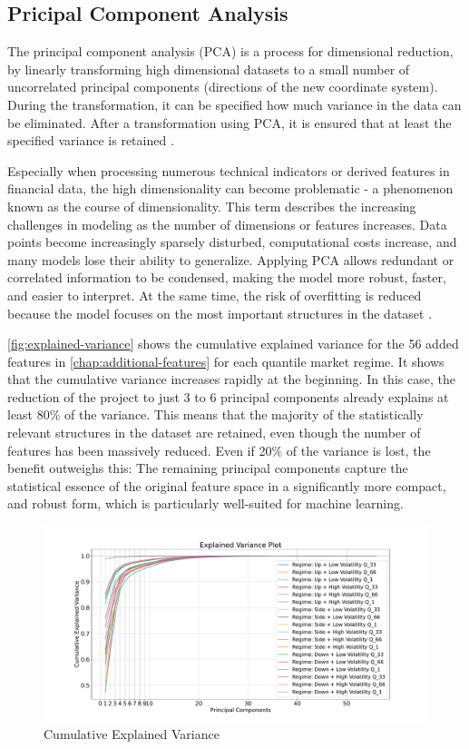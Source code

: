 \subsection{Pricipal Component Analysis}

The principal component analysis (PCA) is a process for dimensional reduction, by linearly transforming high dimensional datasets to a small number of uncorrelated principal components  (directions of the new coordinate system).
During the transformation, it can be specified how much variance in the data can be eliminated.
After a transformation using PCA, it is ensured that at least the specified variance is retained \cite{wikipedia-pca}.

Especially when processing numerous technical indicators or derived features in financial data, the high dimensionality can become problematic - a phenomenon known as the course of dimensionality.
This term describes the increasing challenges in modeling as the number of dimensions or features increases.
Data points become increasingly sparsely disturbed, computational costs increase, and many models lose their ability to generalize.
Applying PCA allows redundant or correlated information to be condensed, making the model more robust, faster, and easier to interpret.
At the same time, the risk of overfitting is reduced because the model focuses on the most important structures in the dataset \cite{wikipedia-curse-od-dimensionality}.

\autoref{fig:explained-variance} shows the cumulative explained variance for the 56 added features in \autoref{chap:additional-features} for each quantile market regime.
It shows that the cumulative variance increases rapidly at the beginning.
In this case, the reduction of the project to just 3 to 6 principal components already explains at least 80\% of the variance.
This means that the majority of the statistically relevant structures in the dataset are retained, even though the number of features has been massively reduced.
Even if 20\% of the variance is lost, the benefit outweighs this: The remaining principal components capture the statistical essence of the original feature space in a significantly more compact, and robust form, which is particularly well-suited for machine learning.


\begin{figure}[H]
    \centering
    \includegraphics[width=\textwidth]{images/eda/explained_variance}
    \caption{Cumulative Explained Variance}
    \label{fig:explained-variance}
\end{figure}

